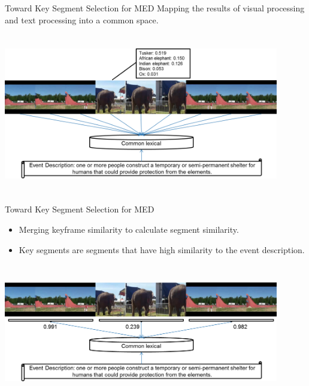 \documentclass{beamer}
\begin{document}
\begin{frame}[t]{Toward Key Segment Selection for MED}
	Mapping the results of visual processing and text processing into a common space.
	\begin{center}
		\includegraphics[width=12cm,height=7cm]{images2/toward1.png}
	\end{center}
\end{frame}

\begin{frame}[t]{Toward Key Segment Selection for MED}
	\begin{itemize}
		\item Merging keyframe similarity to calculate segment similarity. 
		\item Key segments are segments that have high similarity to the event description.
	\end{itemize}

	\begin{center}
		\includegraphics[width=12cm,height=6cm]{images2/toward2.png}
	\end{center}
\end{frame}
	
\end{document}
